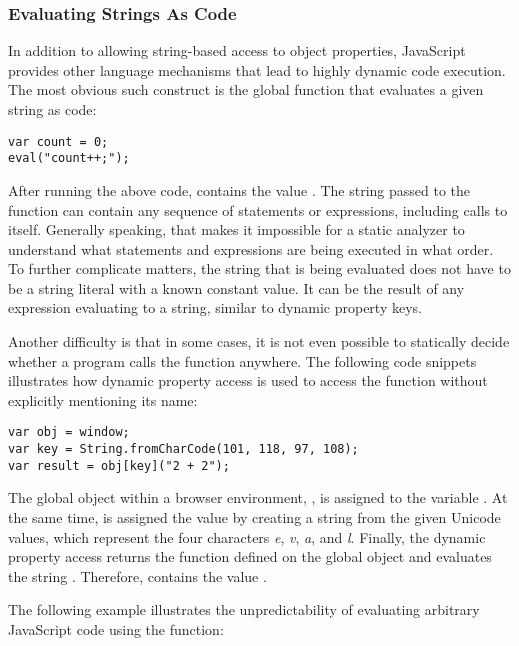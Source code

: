 \pagebreak
\subsubsection{Evaluating Strings As Code}

In addition to allowing string-based access to object properties, JavaScript provides other language mechanisms that lead to highly dynamic code execution. The most obvious such construct is the global  function that evaluates a given string as code:

\begin{verbatim}
var count = 0;
eval("count++;");
\end{verbatim}

After running the above code,  contains the value . The string passed to the  function can contain any sequence of statements or expressions, including calls to  itself. Generally speaking, that makes it impossible for a static analyzer to understand what statements and expressions are being executed in what order. To further complicate matters, the string that is being evaluated does not have to be a string literal with a known constant value. It can be the result of any expression evaluating to a string, similar to dynamic property keys.

Another difficulty is that in some cases, it is not even possible to statically decide whether a program calls the  function anywhere. The following code snippets illustrates how dynamic property access is used to access the  function without explicitly mentioning its name:

\begin{verbatim}
var obj = window;
var key = String.fromCharCode(101, 118, 97, 108);
var result = obj[key]("2 + 2");
\end{verbatim}

The global object within a browser environment, , is assigned to the variable . At the same time,  is assigned the value  by creating a string from the given Unicode values, which represent the four characters \textit{e}, \textit{v}, \textit{a}, and \textit{l}. Finally, the dynamic property access returns the  function defined on the global object and evaluates the string . Therefore,  contains the value .

The following example illustrates the unpredictability of evaluating arbitrary JavaScript code using the  function:

